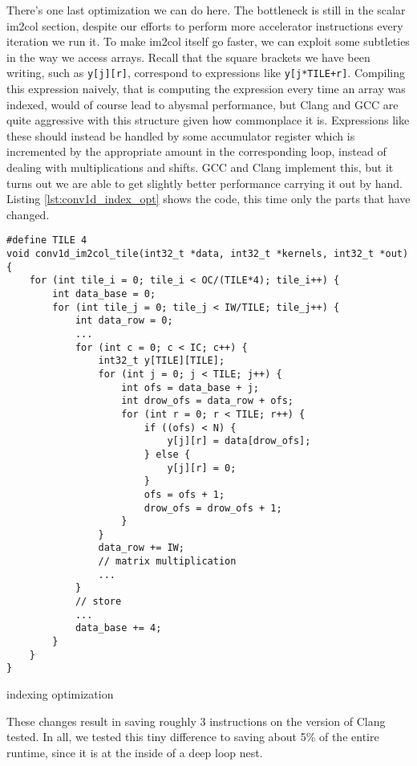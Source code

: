 \documentclass[acmsmall, nonacm=true]{acmart}
\begin{document}
There's one last optimization we can do here. The bottleneck is still in the scalar im2col section, despite our efforts to perform more accelerator instructions every iteration we run it. To make im2col itself go faster, we can exploit some subtleties in the way we access arrays. Recall that the square brackets we have been writing, such as \verb|y[j][r]|, correspond to expressions like \verb|y[j*TILE+r]|. Compiling this expression naively, that is computing the expression every time an array was indexed, would of course lead to abysmal performance, but Clang and GCC are quite aggressive with this structure given how commonplace it is. Expressions like these should instead be handled by some accumulator register which is incremented by the appropriate amount in the corresponding loop, instead of dealing with multiplications and shifts. GCC and Clang implement this, but it turns out we are able to get slightly better performance carrying it out by hand. Listing \ref{lst:conv1d_index_opt} shows the code, this time only the parts that have changed.

\begin{listing}
    \centering
    \begin{verbatim}
#define TILE 4
void conv1d_im2col_tile(int32_t *data, int32_t *kernels, int32_t *out) {
    for (int tile_i = 0; tile_i < OC/(TILE*4); tile_i++) {
        int data_base = 0;
        for (int tile_j = 0; tile_j < IW/TILE; tile_j++) {
            int data_row = 0;
            ...
            for (int c = 0; c < IC; c++) {
                int32_t y[TILE][TILE];
                for (int j = 0; j < TILE; j++) {
                    int ofs = data_base + j;
                    int drow_ofs = data_row + ofs;
                    for (int r = 0; r < TILE; r++) {
                        if ((ofs) < N) {
                            y[j][r] = data[drow_ofs];
                        } else {
                            y[j][r] = 0;
                        }
                        ofs = ofs + 1;
                        drow_ofs = drow_ofs + 1;          
                    }
                }
                data_row += IW;
                // matrix multiplication
                ...
            }
            // store 
            ...
            data_base += 4;
        }
    }
}
\end{verbatim}
    \caption{indexing optimization}
    \label{lst:conv1d_index_opt}
\end{listing}

These changes result in saving roughly 3 instructions on the version of Clang tested. In all, we tested this tiny difference to saving about 5\% of the entire runtime, since it is at the inside of a deep loop nest. 
\end{document}
